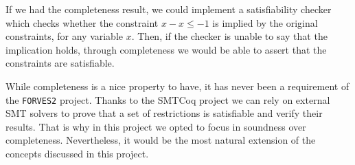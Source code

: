 If we had the completeness result, we could implement a satisfiability checker which checks 
whether the constraint $x - x \le -1$ is implied by the original constraints, for any variable $x$.
Then, if the checker is unable to say that the implication holds, through completeness we would
be able to assert that the constraints are satisfiable.

While completeness is a nice property to have, it has never been a requirement of the \verb|FORVES2|
project. Thanks to the SMTCoq project\cite{EMT+17} we can rely on external SMT solvers to prove
that a set of restrictions is satisfiable and verify their results. That is why in this project
we opted to focus in soundness over completeness. Nevertheless, it would be the most natural 
extension of the concepts discussed in this project.